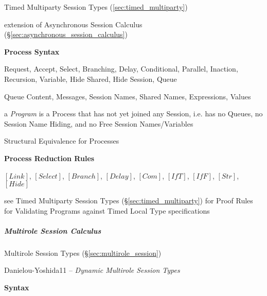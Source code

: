 \fist Timed Multiparty Session Types (\ref{sec:timed_multiparty})

extension of Asynchronous Session Calculus
(\S\ref{sec:asynchronous_session_calculus})

\textbf{Process Syntax} %

Request, Accept, Select, Branching, Delay, Conditional, Parallel,
Inaction, Recursion, Variable, Hide Shared, Hide Session, Queue

Queue Content, Messages, Session Names, Shared Names, Expressions,
Values

a \emph{Program} is a Process that has not yet joined any Session,
i.e. has no Queues, no Session Name Hiding, and no Free Session
Names/Variables

Structural Equivalence for Processes %


\textbf{Process Reduction Rules} %

$[Link]$, $[Select]$, $[Branch]$, $[Delay]$, $[Com]$, $[IfT]$,
$[IfF]$, $[Str]$, $[Hide]$

\fist see Timed Multiparty Session Types
(\S\ref{sec:timed_multiparty}) for Proof Rules for Validating Programs
against Timed Local Type specifications



\subparagraph{Multirole Session Calculus}
\label{sec:multirole_session_calculus}\hfill

\fist Multirole Session Types (\S\ref{sec:multirole_session})

Danielou-Yoshida11 -- \emph{Dynamic Multirole Session Types}

\textbf{Syntax}

